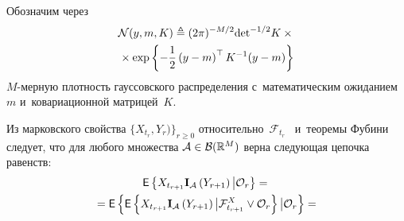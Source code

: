 \begin{multicols}{2}
Обозначим через
\begin{multline*}
 \mathcal{N}(y,m,K) \triangleq (2\pi)^{-M/2} \mathrm{ det}^{-1/2} K\times{}\\
 {}\times\exp
 \left\{ -\displaystyle\frac{\displaystyle 1\mathstrut}{\displaystyle 2\mathstrut}\left(y-m\right)^{\top}K^{-1}(y-m)\right\}
\end{multline*}
 $M$-мер\-ную плот\-ность гауссовского распределения с~математическим 
 ожиданием~$m$ и~ковариационной матрицей~$K$.
 
 Из марковского свойства  $\{X_{t_{r}},Y_{r})\}_{r \geqslant 0}$ 
 относительно~${\mathcal{F}}_{t_{r}}$~\cite{ZhSh_95} и~теоремы Фубини следует, что 
 для любого  множества $\mathcal{A} \hm\in \mathcal{B}(\mathbb{R}^M)$ 
 верна следующая цепочка равенств:
 \begin{multline*}
 {\sf E}\left\{X_{t_{r+1}}\mathbf{I}_{\mathcal{A}}
 \left(Y_{r+1}\right)\big|\mathcal{O}_r\right\}={}\\
 {}=
{\sf E}\left\{{\sf E}\left\{X_{t_{r+1}}\mathbf{I}_{\mathcal{A}}
\left(Y_{r+1}\right)\big|
\mathcal{F}^X_{t_{r+1}} \vee \mathcal{O}_r\right\}
 \big|\mathcal{O}_r\right\} = {}
\end{multline*}


\end{multicols}
